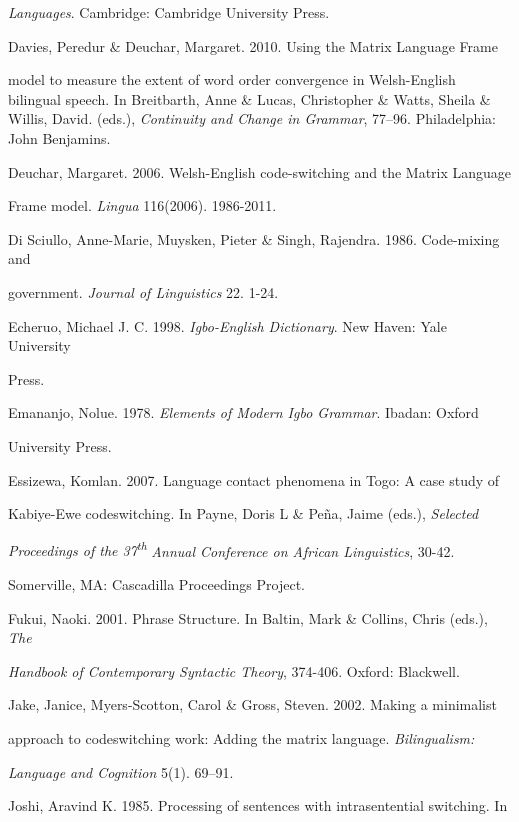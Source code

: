 \documentclass[output=paper]{langsci/langscibook}
\begin{document}
\textit{Languages}. Cambridge: Cambridge University Press.{~}



Davies, Peredur \& Deuchar, Margaret. 2010. Using the Matrix Language Frame 


model to measure the extent of word order convergence in Welsh-English bilingual speech. In Breitbarth, Anne \& Lucas, Christopher \& Watts, Sheila \& Willis, David. (eds.), \textit{Continuity and Change in Grammar}, 77–96. Philadelphia: John Benjamins.

Deuchar, Margaret. 2006. Welsh-English code-switching and the Matrix Language 

  Frame model. \textit{Lingua }116(2006). 1986-2011.

Di Sciullo, Anne-Marie, Muysken, Pieter \& Singh, Rajendra. 1986. Code-mixing and 

government. \textit{Journal of Linguistics }22. 1-24.


Echeruo, Michael J. C. 1998. \textit{Igbo-English Dictionary}. New Haven: Yale University 



Press. 



Emananjo, Nolue. 1978. \textit{Elements of Modern Igbo Grammar}. Ibadan: Oxford 



University Press.  


Essizewa, Komlan. 2007. Language contact phenomena in Togo: A case study of 

  Kabiye-Ewe codeswitching. In Payne, Doris L \& Peña, Jaime (eds.), \textit{Selected }

\textit{  Proceedings of the 37}\textit{\textsuperscript{th}}\textit{ Annual Conference on African Linguistics}, 30-42. 

  Somerville, MA: Cascadilla Proceedings Project. 

Fukui,  Naoki. 2001. Phrase Structure. In Baltin, Mark \& Collins, Chris (eds.), \textit{The }

\textit{  Handbook of Contemporary Syntactic Theory}, 374-406. Oxford: Blackwell.

Jake, Janice, Myers-Scotton, Carol \& Gross, Steven. 2002. Making a minimalist 

  approach to codeswitching work: Adding the matrix language. \textit{Bilingualism: }

\textit{  Language and Cognition} 5(1). 69–91.

Joshi, Aravind K. 1985. Processing of sentences with intrasentential switching. In 
\end{document}

